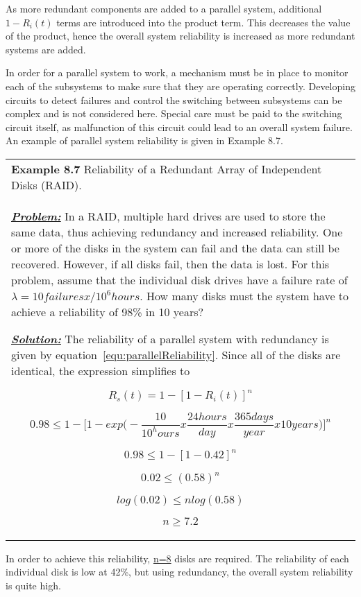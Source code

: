 As more redundant components are added to a parallel system, additional
$1-R_i(t)$ terms are introduced into the
product term. This decreases the value of the product, hence the overall
system reliability is increased as more redundant systems are added.

In order for a parallel system to work, a mechanism must be in place to
monitor each of the subsystems to make sure that they are operating
correctly. Developing circuits to detect failures and control the
switching between subsystems can be complex and is not considered here.
Special care must be paid to the switching circuit itself, as
malfunction of this circuit could lead to an overall system failure. An
example of parallel system reliability is given in Example 8.7.


\begin{table}
\begin{tabular}{m{15cm}|}
\textbf{Example 8.7} 
Reliability of a Redundant Array of Independent Disks (RAID).\\

\emph{\textbf{\ul{Problem:}}} In a RAID, multiple hard drives are used
to store the same data, thus achieving redundancy and increased
reliability. One or more of the disks in the system can fail and the
data can still be recovered. However, if all disks fail, then the data
is lost. For this problem, assume that the individual disk drives have a
failure rate of $\lambda = 10 failuresx/10^6 hours$. How many disks
must the system have to achieve a reliability of 98\% in 10 years?

\emph{\textbf{\ul{Solution:}}} The reliability of a parallel system with
redundancy is given by equation~\ref{equ:parallelReliability}. 
Since all of the disks are identical, the expression simplifies to

$$R_s(t) = 1 - \left[ 1 - R_i(t) \right]^n$$

$$0.98 \leq 1 - \big[ 1 - exp\big( - \frac {10}{10^ hours} x \frac{24 hours}{day} x \frac{365 days}{year} x 10 years \big) \big]^n$$

$$0.98 \leq 1 - \left[1-0.42\right]^n$$

$$0.02 \leq (0.58)^n$$

$$log(0.02) \leq nlog(0.58)$$

$$n \geq 7.2$$
\end{tabular}
\end{table}

In order to achieve this reliability, \ul{n=8} disks are required. The
reliability of each individual disk is low at 42\%, but using
redundancy, the overall system reliability is quite high.

